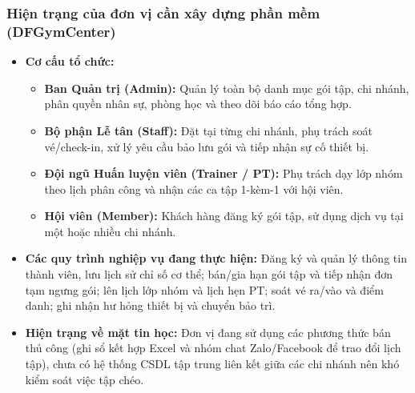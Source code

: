\documentclass[a4paper,12pt]{article}
\begin{document}
\subsubsection{Hiện trạng của đơn vị cần xây dựng phần mềm (DFGymCenter)}
\begin{itemize}
    \item \textbf{Cơ cấu tổ chức:}
    \begin{itemize}
        \item \textbf{Ban Quản trị (Admin):} Quản lý toàn bộ danh mục gói tập, chi nhánh, phân quyền nhân sự, phòng học và theo dõi báo cáo tổng hợp.
        \item \textbf{Bộ phận Lễ tân (Staff):} Đặt tại từng chi nhánh, phụ trách soát vé/check-in, xử lý yêu cầu bảo lưu gói và tiếp nhận sự cố thiết bị.
        \item \textbf{Đội ngũ Huấn luyện viên (Trainer / PT):} Phụ trách dạy lớp nhóm theo lịch phân công và nhận các ca tập 1-kèm-1 với hội viên.
        \item \textbf{Hội viên (Member):} Khách hàng đăng ký gói tập, sử dụng dịch vụ tại một hoặc nhiều chi nhánh.
    \end{itemize}
    \item \textbf{Các quy trình nghiệp vụ đang thực hiện:} Đăng ký và quản lý thông tin thành viên, lưu lịch sử chỉ số cơ thể; bán/gia hạn gói tập và tiếp nhận đơn tạm ngưng gói; lên lịch lớp nhóm và lịch hẹn PT; soát vé ra/vào và điểm danh; ghi nhận hư hỏng thiết bị và chuyển bảo trì.
    \item \textbf{Hiện trạng về mặt tin học:} Đơn vị đang sử dụng các phương thức bán thủ công (ghi sổ kết hợp Excel và nhóm chat Zalo/Facebook để trao đổi lịch tập), chưa có hệ thống CSDL tập trung liên kết giữa các chi nhánh nên khó kiểm soát việc tập chéo.
\end{itemize}
\end{document}
